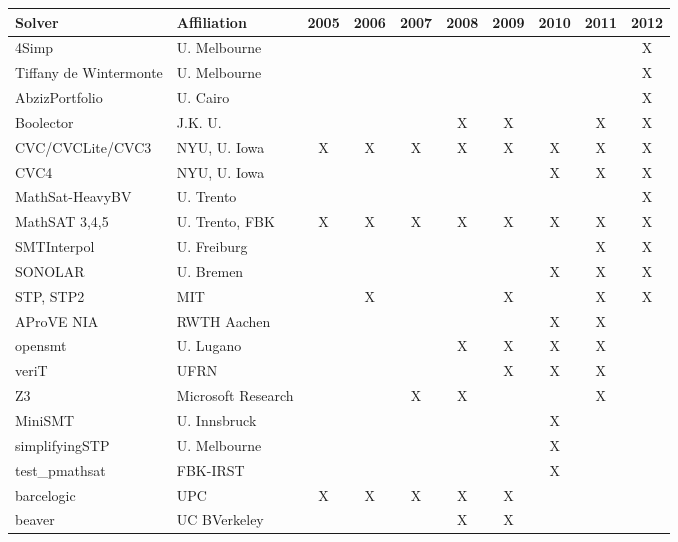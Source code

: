\documentclass[twosize,11pt]{article}
\begin{document}
\begin{table}[t]
\centering
\begin{tabular}{|l|l|c|c|c|c|c|c|c|c|}
\hline
Solver & Affiliation & 2005 & 2006 & 2007 & 2008 & 2009 & 2010 & 2011 & 2012 \\
\hline
4Simp	                 & U. Melbourne   &   &   &   &   &   &   &   & X \\								
Tiffany de Wintermonte & U. Melbourne 	&   &   &   &   &   &   &   & X \\							
AbzizPortfolio         & U. Cairo       &   &   &   &   &   &   &   & X \\							
Boolector              & J.K. U.        &   &   &   & X & X &   & X & X \\
CVC/CVCLite/CVC3       & NYU, U. Iowa   & X & X & X & X & X & X & X & X \\
CVC4	                 & NYU, U. Iowa   &   &   &   &   &   & X & X & X \\
MathSat-HeavyBV        & U. Trento      &   &   &   &   &   &   &   & X \\								
MathSAT 3,4,5          & U. Trento, FBK & X & X & X & X & X & X & X & X \\
SMTInterpol            & U. Freiburg    &   &   &   &   &   &   & X & X \\
SONOLAR                & U. Bremen      &   &   &   &   &   & X & X & X \\
STP, STP2              & MIT            &   & X &   &   & X &   & X & X \\
AProVE NIA             & RWTH Aachen    &   &   &   &   &   & X & X &   \\
opensmt                & U. Lugano      &   &   &   & X & X & X & X &   \\
veriT                  & UFRN           &   &   &   &   & X & X & X &   \\
Z3                & Microsoft Research  &   &   & X & X &   &   & X &   \\
MiniSMT                & U. Innsbruck   &   &   &   &   &   & X &   &   \\	
simplifyingSTP         & U. Melbourne   &   &   &   &   &   & X &   &   \\	
test\_pmathsat         & FBK-IRST       &   &   &   &   &   & X &   &   \\	
barcelogic             & UPC            & X & X & X & X & X &   &   &   \\	
beaver                 & UC BVerkeley   &   &   &   & X & X &   &   &   \\		

\end{tabular}
\end{table}
\end{document}
